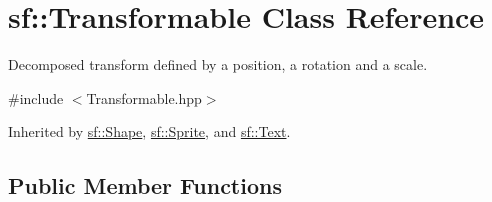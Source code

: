 \hypertarget{classsf_1_1_transformable}{\section{sf\+:\+:Transformable Class Reference}
\label{classsf_1_1_transformable}
}


Decomposed transform defined by a position, a rotation and a scale.  




{\ttfamily \#include $<$Transformable.\+hpp$>$}



Inherited by \hyperlink{classsf_1_1_shape}{sf\+::\+Shape}, \hyperlink{classsf_1_1_sprite}{sf\+::\+Sprite}, and \hyperlink{classsf_1_1_text}{sf\+::\+Text}.

\subsection*{Public Member Functions}
